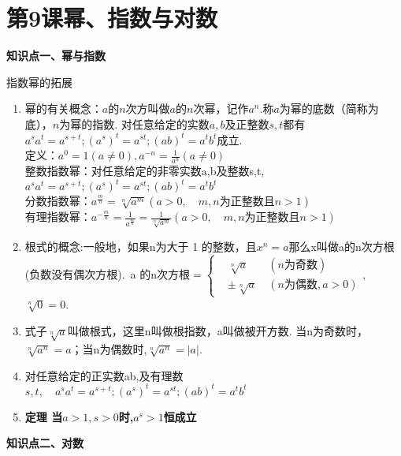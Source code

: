 \section{第9课\quad 幂、指数与对数}

\begin{formal}
    {\large \textbf{知识点一、幂与指数}}
\end{formal}
指数幂的拓展
\begin{enumerate}
    \item 幂的有关概念：$a$的$n$次方叫做$a$的$n$次幂，记作$a^n$.称$a$为幂的底数（简称为底），$n$为幂的指数.
    对任意给定的实数$a,b$及正整数$s,t$都有$a^sa^t=a^{s+t};(a^s)^t=a^{st};(ab)^t=a^tb^t$成立.\\
    定义：$\displaystyle a^0=1(a \ne 0),a^{-n}=\frac{1}{a^n}(a \ne 0)$\\
    整数指数幂：对任意给定的非零实数a,b及整数s,t,$a^sa^t=a^{s+t};(a^s)^t=a^{st};(ab)^t=a^tb^t$\\
    分数指数幂：$\displaystyle a^{\frac{m}{n}}=\sqrt[n]{a^m}(a>0, \quad m,n \text{为正整数且}n>1)$\\
    有理指数幂：$\displaystyle a^{-\frac{m}{n}}=\frac{1}{a^{\frac{m}{n}}}=\frac{1}{\sqrt[n]{a^m}}(a>0, \quad m,n \text{为正整数且}n>1)$
    \item 根式的概念:一般地，如果n为大于 1 的整数，且$x^n =a$那么x叫做a的n次方根(负数没有偶次方根).\ a
    的n次方根$\displaystyle =\left\{
        \begin{aligned}
        &\sqrt[n]{a}\ & (n\text{为奇数}) \\
        &\pm \sqrt[n]{a}\ & (n\text{为偶数},a>0)
        \end{aligned}
        \right. ,$\ $\sqrt[n]{0}=0$.
    \item 式子$\sqrt[n]{a}$叫做根式，这里n叫做根指数，a叫做被开方数.
    当n为奇数时，$\sqrt[n]{a^n}=a$；当n为偶数时,$\sqrt[n]{a^n}=|a|$.
    \item 对任意给定的正实数ab,及有理数$s,t,\quad a^sa^t=a^{s+t};(a^s)^t=a^{st};(ab)^t=a^tb^t$
    \item \textbf{定理 当$a>1,s>0$时,$a^s>1$恒成立}
\end{enumerate}



\begin{formal}
    {\large \textbf{知识点二、对数}}
\end{formal}

